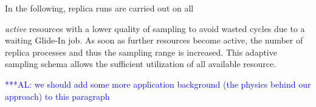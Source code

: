 \documentclass{rspublic}
\newcommand{\alnote}[1]{ {\textcolor{blue} { ***AL: #1 }}}
\newcommand{\alnote}[1]{}
\newcommand{\glidein}[1]{Glide-In }
\newcommand{\replicaagent}[1]{Replica-Agent }
\newcommand{\remanager}[1]{RE-Manager }
\begin{document}
In the following, replica runs are carried out on all {{\em active}
resources with a lower quality of sampling
to avoid wasted cycles due to a waiting \glidein\ job. As soon as further
resources become active, the number of replica processes and thus the
sampling range is increased. This adaptive sampling schema allows the 
sufficient utilization of all available resource. 

\alnote{we should add some more application background (the physics behind our approach) to this paragraph}

  
  
%  
%                                                           
% 
%            



}
\end{document}
